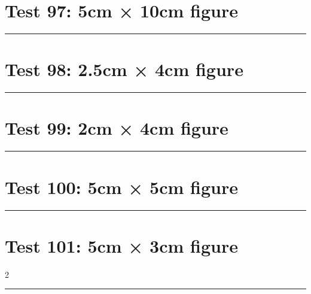 \documentclass[a4paper,11pt]{article}
\begin{document}
\section*{Test 97: 5cm × 10cm figure}
\begin{swarmwrap}%
  \begin{minipage}[t]{5cm}
    \centering
    \rule{\linewidth}{10cm}
  \end{minipage}%
\end{swarmwrap}%
\swarmwrapnext
\lipsum[41]
\lipsum[42]
\lipsum[43]
\lipsum[44]
\lipsum[45]
\lipsum[46]
\section*{Test 98: 2.5cm × 4cm figure}
\begin{swarmwrap}%
  \begin{minipage}[t]{2cm}
    \centering
    \rule{\linewidth}{4cm}
  \end{minipage}%
\end{swarmwrap}%
\swarmwrapnext
\lipsum[107]
\lipsum[108]
\lipsum[109]
\lipsum[110]
\section*{Test 99: 2cm × 4cm figure}
\begin{swarmwrap}%
  \begin{minipage}[t]{2cm}
    \centering
    \rule{\linewidth}{4cm}
  \end{minipage}%
\end{swarmwrap}%
\swarmwrapnext
\lipsum[107]
\lipsum[108]
\lipsum[109]
\lipsum[110]
\lipsum[111]
\section*{Test 100: 5cm × 5cm figure}
\begin{swarmwrap}%
  \begin{minipage}[t]{5cm}
    \centering
    \rule{\linewidth}{5cm}
  \end{minipage}%
\end{swarmwrap}%
\swarmwrapnext
\lipsum[42]
\lipsum[43]
\lipsum[44]
\lipsum[45]
\lipsum[46]
\section*{Test 101: 5cm × 3cm figure}
\begin{multicols}{2}
  \begin{swarmwrap}%
    \begin{minipage}[t]{5cm}
      \centering
      \rule{\linewidth}{3cm}
    \end{minipage}%
  \end{swarmwrap}%
  \swarmwrapnext
  \lipsum[11]
  \lipsum[12]
  \lipsum[13]
  \lipsum[14]
  \lipsum[15]
  \lipsum[16]
\end{multicols}
\end{document}
